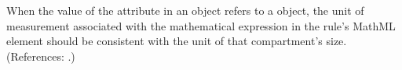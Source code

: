 When the value of the attribute  in an \AssignmentRule
object refers to a \Compartment object, the unit of measurement associated
with the mathematical expression in the rule's MathML  element
should be consistent with the unit of that compartment's size.
(References: .)
